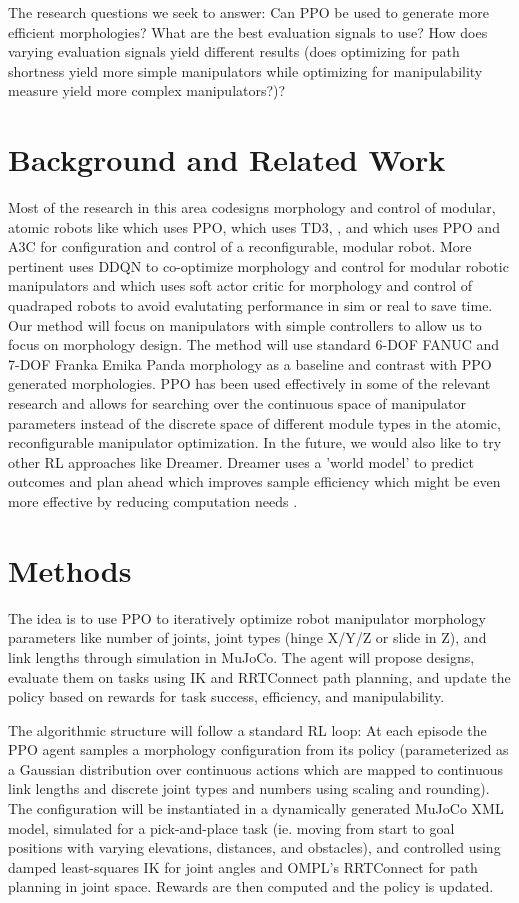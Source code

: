 \documentclass[conference]{IEEEtran}
\begin{document}
The research questions we seek to answer: Can PPO be used to generate more efficient morphologies? What are the best evaluation signals to use? How does varying evaluation signals yield different results (does optimizing for path shortness yield more simple manipulators while optimizing for manipulability measure yield more complex manipulators?)?

\section{Background and Related Work}
Most of the research in this area codesigns morphology and control of modular, atomic robots like \cite{bhatia2023reinforcement} which uses PPO, \cite{tjanaka2023co} which uses TD3, \cite{spielberg2025accelerated}, and \cite{kalimuthu2023} which uses PPO and A3C for configuration and control of a reconfigurable, modular robot.
More pertinent \cite{ding2024modular} uses DDQN to co-optimize morphology and control for modular robotic manipulators and \cite{luck2019data} which uses soft actor critic for morphology and control of quadraped robots to avoid evalutating performance in sim or real to save time.
Our method will focus on manipulators with simple controllers to allow us to focus on morphology design.
The method will use standard 6-DOF FANUC and 7-DOF Franka Emika Panda morphology as a baseline and contrast with PPO generated morphologies.
PPO has been used effectively in some of the relevant research and allows for searching over the continuous space of manipulator parameters instead of the discrete space of different module types in the atomic, reconfigurable manipulator optimization.
In the future, we would also like to try other RL approaches like Dreamer.
Dreamer uses a 'world model' to predict outcomes and plan ahead which improves sample efficiency which might be even more effective by reducing computation needs \cite{hafner2019dream}.

\section{Methods}
The idea is to use PPO to iteratively optimize robot manipulator morphology parameters like number of joints, joint types (hinge X/Y/Z or slide in Z), and link lengths through simulation in MuJoCo.
The agent will propose designs, evaluate them on tasks using IK and RRTConnect path planning, and update the policy based on rewards for task success, efficiency, and manipulability.

The algorithmic structure will follow a standard RL loop: At each episode the PPO agent samples a morphology configuration from its policy (parameterized as a Gaussian distribution over continuous actions which are mapped to continuous link lengths and discrete joint types and numbers using scaling and rounding).
The configuration will be instantiated in a dynamically generated MuJoCo XML model, simulated for a pick-and-place task (ie. moving from start to goal positions with varying elevations, distances, and obstacles), and controlled using damped least-squares IK for joint angles and OMPL's RRTConnect for path planning in joint space.
Rewards are then computed and the policy is updated.
\end{document}
